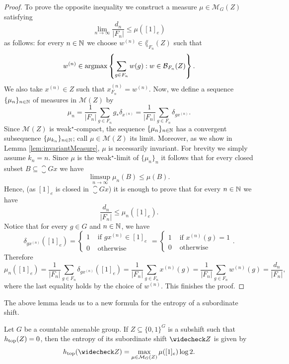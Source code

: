 \begin{proof}
To prove the opposite inequality we construct a measure $\mu\in\mathcal{M}_G(Z)$ satisfying
\[
\lim_{n\to\infty}\frac{d_n}{|F_n|} \leq \mu([1]_e)
\]
as follows: for every $n\in \mathbb{N}$ we choose $w^{(n)}\in \lang_{F_n}(Z)$ such that
\[
w^{(n)}\in\argmax\inbrace{\sum_{g\in F_n}w(g): w\in \lang_{F_n}(Z)}.
\]
We also take $x^{(n)}\in Z$ such that $x^{(n)}_{F_n} = w^{(n)}$.
Now, we define a sequence $\{\mu_n\}_{n\in\mathbb{N}}$ of measures in $\mathcal{M}(Z)$ by
\[
\mu_n = \frac{1}{|F_n|}\sum_{g\in F_n} g_*\delta_{x^{(n)}} = \frac{1}{|F_n|}\sum_{g\in F_n} \delta_{gx^{(n)}}.
\]
Since $\mathcal{M}(Z)$ is weak$^\star$-compact, the sequence $\{\mu_n\}_{n\in\mathbb{N}}$ has a convergent subsequence $\{\mu_{k_n}\}_{n\in\mathbb{N}}$; call $\mu \in \mathcal{M}(Z)$ its limit.
Moreover, as we show in Lemma \ref{lem:invariantMeasure}, $\mu$ is necessarily invariant.
 For brevity we simply assume $k_n=n$. Since $\mu$ is the weak$^\star$-limit of $\{\mu_n\}_n$ it follows that for every closed subset $B\subseteq \closure{Gx}$ we have
\[
\limsup_{n\to\infty} \mu_n(B)\leq\mu(B).
\]
Hence, (as $[1]_e$ is closed in $\closure{Gx}$) it is enough to prove that for every $n\in\mathbb{N}$ we have
\[
\frac{d_n}{|F_n|} \leq \mu_n([1]_e).
\]
Notice that for every $g\in G$ and $n\in\mathbb{N}$, we have
\[
\delta_{gx^{(n)}}([1]_e) = \begin{cases}1 &\text{ if } gx^{(n)}\in[1]_e \\ 0 &\text{ otherwise}\end{cases} = \begin{cases}1 &\text{ if } x^{(n)}(g)=1 \\ 0 &\text{ otherwise}\end{cases}.
\]
Therefore 
\[
\mu_n([1]_e) = \frac{1}{|F_n|}\sum_{g\in F_n} \delta_{gx^{(n)}}([1]_e) = \frac{1}{|F_n|}\sum_{g\in F_n} x^{(n)}(g) = \frac{1}{|F_n|}\sum_{g\in F_n}w^{(n)}(g) = \frac{d_n}{|F_n|},
\]
where the last equality holds by the choice of $w^{(n)}$. This finishes the proof.
\end{proof}

\noindent
The above lemma leads us to a new formula for the entropy of a subordinate shift.

\begin{lem}\label{lem:subordinate_measure}
Let $G$ be a countable amenable group. If $Z\subseteq\{0,1\}^G$ is a subshift such that $h_\mathrm{top}(Z)=0$, then the entropy of its subordinate shift $\subord{Z}$ is given by
\[ 
\htop(\subord{Z}) = \max_{\mu\in\mathcal{M}_G(Z)}\mu([1]_e)\log 2.
\]
\end{lem}

